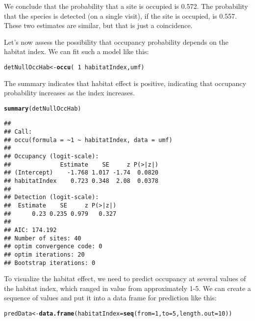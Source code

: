 \documentclass[12pt]{article}\usepackage[]{graphicx}\usepackage[]{xcolor}
\makeatletter
\newcommand{\hlnum}[1]{\textcolor[rgb]{0.686,0.059,0.569}{#1}}%
\newcommand{\hlopt}[1]{\textcolor[rgb]{0,0,0}{#1}}%
\newcommand{\hlstd}[1]{\textcolor[rgb]{0.345,0.345,0.345}{#1}}%
\newcommand{\hlkwb}[1]{\textcolor[rgb]{0.69,0.353,0.396}{#1}}%
\newcommand{\hlkwc}[1]{\textcolor[rgb]{0.333,0.667,0.333}{#1}}%
\newcommand{\hlkwd}[1]{\textcolor[rgb]{0.737,0.353,0.396}{\textbf{#1}}}%
\newenvironment{kframe}{%
 \def\at@end@of@kframe{}%
 \ifinner\ifhmode%
  \def\at@end@of@kframe{\end{minipage}}%
  \begin{minipage}{\columnwidth}%
 \fi\fi%
 \def\FrameCommand##1{\hskip\@totalleftmargin \hskip-\fboxsep
 \colorbox{shadecolor}{##1}\hskip-\fboxsep
     \hskip-\linewidth \hskip-\@totalleftmargin \hskip\columnwidth}%
 \MakeFramed {\advance\hsize-\width
   \@totalleftmargin\z@ \linewidth\hsize
   \@setminipage}}%
 {\par\unskip\endMakeFramed%
 \at@end@of@kframe}
\newenvironment{knitrout}{}{} %
\makeatother
\begin{document}
We conclude that the probability that a site is occupied is 0.572. The
probability that the species is detected (on a single visit), if the
site is occupied, is 0.557. These two estimates are similar, but that
is just a coincidence.

Let's now assess the possibility that occupancy probability depends on
the habitat index. We can fit such a model like this: 

\begin{knitrout}
\color{fgcolor}\begin{kframe}
\begin{alltt}
\hlstd{detNullOccHab} \hlkwb{<-} \hlkwd{occu}\hlstd{(}\hlopt{~}\hlnum{1} \hlopt{~}\hlstd{habitatIndex, umf)}
\end{alltt}
\end{kframe}
\end{knitrout}

The summary indicates that habitat effect is positive, indicating that
occupancy probability increases as the index increases.  

\begin{knitrout}
\color{fgcolor}\begin{kframe}
\begin{alltt}
\hlkwd{summary}\hlstd{(detNullOccHab)}
\end{alltt}
\begin{verbatim}
## 
## Call:
## occu(formula = ~1 ~ habitatIndex, data = umf)
## 
## Occupancy (logit-scale):
##              Estimate    SE     z P(>|z|)
## (Intercept)    -1.768 1.017 -1.74  0.0820
## habitatIndex    0.723 0.348  2.08  0.0378
## 
## Detection (logit-scale):
##  Estimate    SE     z P(>|z|)
##      0.23 0.235 0.979   0.327
## 
## AIC: 174.192 
## Number of sites: 40
## optim convergence code: 0
## optim iterations: 20 
## Bootstrap iterations: 0
\end{verbatim}
\end{kframe}
\end{knitrout}


To visualize the habitat effect, we need to predict occupancy at
several values of the habitat index, which ranged in value from
approximately 1-5. We can create a sequence of values and put it into
a data frame for prediction like this: 

\begin{knitrout}
\color{fgcolor}\begin{kframe}
\begin{alltt}
\hlstd{predData} \hlkwb{<-} \hlkwd{data.frame}\hlstd{(}\hlkwc{habitatIndex}\hlstd{=}\hlkwd{seq}\hlstd{(}\hlkwc{from}\hlstd{=}\hlnum{1}\hlstd{,} \hlkwc{to}\hlstd{=}\hlnum{5}\hlstd{,} \hlkwc{length.out}\hlstd{=}\hlnum{10}\hlstd{))}
\end{alltt}
\end{kframe}
\end{knitrout}
\end{document}
